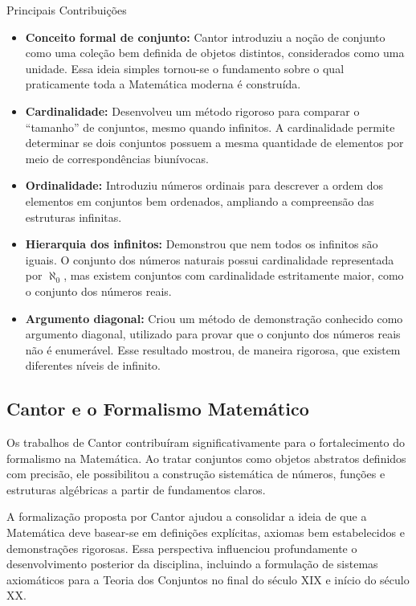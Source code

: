 \documentclass[12pt,a4paper,openright]{book}
\begin{document}
\begin{block}{Principais Contribuições}
  
  \begin{itemize}
    \item \textbf{Conceito formal de conjunto:} Cantor introduziu a noção de conjunto como uma coleção bem definida de objetos distintos, considerados como uma unidade. Essa ideia simples tornou-se o fundamento sobre o qual praticamente toda a Matemática moderna é construída.
    
    \item \textbf{Cardinalidade:} Desenvolveu um método rigoroso para comparar o “tamanho” de conjuntos, mesmo quando infinitos. A cardinalidade permite determinar se dois conjuntos possuem a mesma quantidade de elementos por meio de correspondências biunívocas.
    
    \item \textbf{Ordinalidade:} Introduziu números ordinais para descrever a ordem dos elementos em conjuntos bem ordenados, ampliando a compreensão das estruturas infinitas.
    
    \item \textbf{Hierarquia dos infinitos:} Demonstrou que nem todos os infinitos são iguais. O conjunto dos números naturais possui cardinalidade representada por \(\aleph_0\), mas existem conjuntos com cardinalidade estritamente maior, como o conjunto dos números reais.
    
    \item \textbf{Argumento diagonal:} Criou um método de demonstração conhecido como argumento diagonal, utilizado para provar que o conjunto dos números reais não é enumerável. Esse resultado mostrou, de maneira rigorosa, que existem diferentes níveis de infinito.
    
  \end{itemize}
\end{block}

\subsection*{Cantor e o Formalismo Matemático}

Os trabalhos de Cantor contribuíram significativamente para o fortalecimento do formalismo na Matemática. Ao tratar conjuntos como objetos abstratos definidos com precisão, ele possibilitou a construção sistemática de números, funções e estruturas algébricas a partir de fundamentos claros.

A formalização proposta por Cantor ajudou a consolidar a ideia de que a Matemática deve basear-se em definições explícitas, axiomas bem estabelecidos e demonstrações rigorosas. Essa perspectiva influenciou profundamente o desenvolvimento posterior da disciplina, incluindo a formulação de sistemas axiomáticos para a Teoria dos Conjuntos no final do século XIX e início do século XX.
\end{document}
